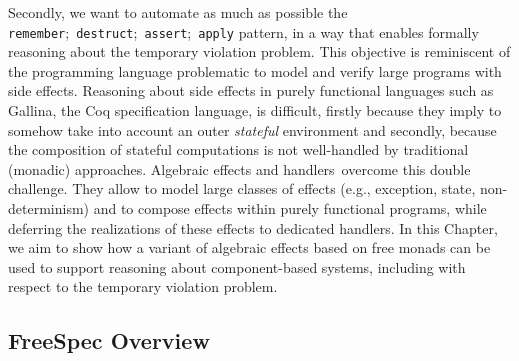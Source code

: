 Secondly, we want to automate as much as possible the
\texttt{remember};~\texttt{destruct};~\texttt{assert};~\texttt{apply} pattern,
in a way that enables formally reasoning about the temporary violation problem.
%
This objective is reminiscent of the programming language problematic to model
and verify large programs with side effects.
%
Reasoning about side effects in purely functional languages such as {\textsc
  Gallina}, the Coq specification language, is difficult, firstly because they
imply to somehow take into account an outer \emph{stateful} environment and
secondly, because the composition of stateful computations is not well-handled
by traditional (monadic) approaches.
%
Algebraic effects and handlers\,\cite{bauer2015effects} overcome this double
challenge.
%
They allow to model large classes of effects (e.g., exception, state,
non-determinism) and to compose effects within purely functional programs, while
deferring the realizations of these effects to dedicated handlers.
%
In this Chapter, we aim to show how a variant of algebraic effects based on free
monads can be used to support reasoning about component-based systems, including
with respect to the temporary violation problem.

\subsection{FreeSpec Overview}
\label{freespec:subsec:freespecoverview}

